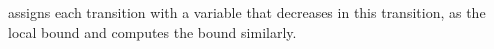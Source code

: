 assigns each transition with a variable that decreases in this transition, as the local bound and computes the bound similarly.
% 
%
%
